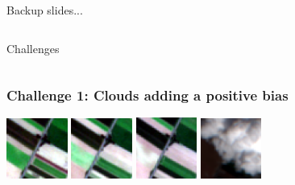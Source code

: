 \documentclass[%
  aspectratio=169,
  9pt,
  USenglish,
  titlegraphic, %
  affiliationintitlepagehead,
  affiliation,
]{beamer}
\begin{document}
\appendix

{
	\begin{frame}[plain]
	
	\vfill
	\Huge\color{white}
	\begin{center}
		\begin{columns}
			\vspace{7em}
			
			\hfill 
			Backup slides...
			
		\end{columns}
	\end{center}
	
	\vfill
\end{frame}
}


{
	\begin{frame}[plain]
	
	\vfill
	\Huge\color{white}
	\begin{center}
		\begin{columns}
			\column{.5\textwidth}
			\vspace{7em}
			
			\hfill 
			Challenges
			\column{.5\textwidth}
			
		\end{columns}
	\end{center}
	
	\vfill
\end{frame}
}



\begin{frame}
\frametitle{Challenge 1: Clouds adding a positive bias}

\includegraphics[width=2cm]{images/s2grid/1}
\includegraphics[width=2cm]{images/s2grid/2}
\includegraphics[width=2cm]{images/s2grid/3}
\includegraphics[width=2cm]{images/s2grid/4}

%
\examplecorn

\end{frame}
\end{document}
